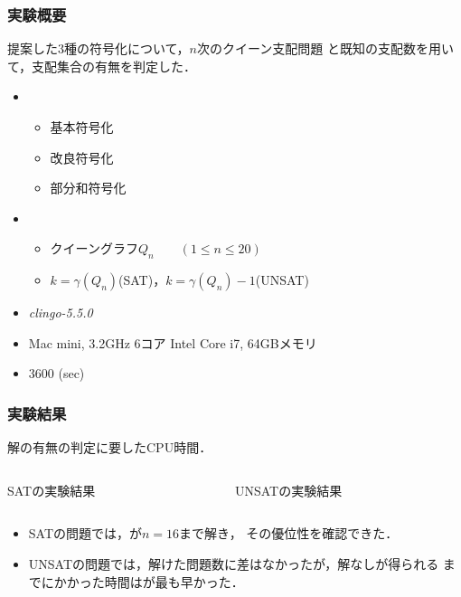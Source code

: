 \documentclass[dvipdfmx,10pt]{beamer}
\begin{document}
\begin{frame}\frametitle{実験概要}
 \begin{block}{}
  提案した3種の符号化について，$n$次のクイーン支配問題
  と既知の支配数を用いて，支配集合の有無を判定した．
 \end{block}
 \begin{itemize}
  \item {}
	\begin{itemize}
	 \item 基本符号化
	 \item 改良符号化
	 \item 部分和符号化
	\end{itemize}
  \item {}
	\begin{itemize}
	 \item クイーングラフ$Q_{n} \qquad (1 \leq n \leq 20)$
	 \item $k=\gamma(Q_{n})$\quad (SAT)，$k=\gamma(Q_{n})-1$\quad (UNSAT)
	\end{itemize}
  \item {} \textit{clingo-5.5.0}
  \item {} Mac mini, 3.2GHz 6コア Intel Core i7, 64GBメモリ
  \item {} 3600 (sec)
 \end{itemize}
\end{frame}

%
%

\begin{frame}\frametitle{実験結果}
 \begin{block}{}
  解の有無の判定に要したCPU時間．
 \end{block}
 \begin{columns}
  \begin{column}{0.50\textwidth}
   \begin{table}[htbp]
    \caption{SATの実験結果}
    \scalebox{0.7}{
    }
   \end{table}
  \end{column}
  \begin{column}{0.50\textwidth}
   \begin{table}[htbp]
    \caption{UNSATの実験結果}
    \scalebox{0.7}{
    }
   \end{table}
  \end{column}
 \end{columns} 
 \begin{itemize}
  \item SATの問題では，が$n=16$まで解き，
	その優位性を確認できた．
  \item UNSATの問題では，解けた問題数に差はなかったが，解なしが得られる
	までにかかった時間はが最も早かった．
 \end{itemize}
\end{frame}
\end{document}
